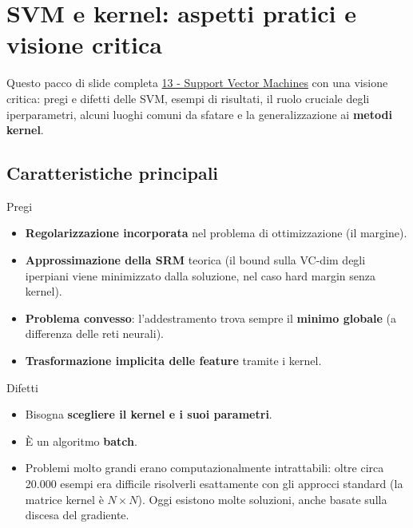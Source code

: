 \chapter{SVM e kernel: aspetti pratici e visione critica}\label{ch-14}

Questo pacco di slide completa
\href{13\%20-\%20Support\%20Vector\%20Machines}{13 - Support Vector
Machines} con una visione critica: pregi e difetti delle SVM, esempi di
risultati, il ruolo cruciale degli iperparametri, alcuni luoghi comuni
da sfatare e la generalizzazione ai \textbf{metodi kernel}.

\section{Caratteristiche principali}\label{caratteristiche-principali}

\begin{boxabstract}{Pregi}

\begin{itemize}
\tightlist
\item
  \textbf{Regolarizzazione incorporata} nel problema di ottimizzazione
  (il margine).
\item
  \textbf{Approssimazione della SRM} teorica (il bound sulla VC-dim
  degli iperpiani viene minimizzato dalla soluzione, nel caso hard
  margin senza kernel).
\item
  \textbf{Problema convesso}: l'addestramento trova sempre il
  \textbf{minimo globale} (a differenza delle reti neurali).
\item
  \textbf{Trasformazione implicita delle feature} tramite i kernel.
\end{itemize}

\end{boxabstract}

\begin{boxwarning}{Difetti}

\begin{itemize}
\tightlist
\item
  Bisogna \textbf{scegliere il kernel e i suoi parametri}.
\item
  È un algoritmo \textbf{batch}.
\item
  Problemi molto grandi erano computazionalmente intrattabili: oltre
  circa 20.000 esempi era difficile risolverli esattamente con gli
  approcci standard (la matrice kernel è \(N \times N\)). Oggi esistono
  molte soluzioni, anche basate sulla discesa del gradiente.
\end{itemize}

\end{boxwarning}

